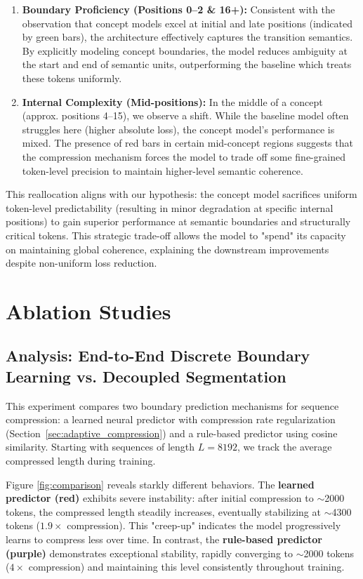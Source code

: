 \begin{enumerate}
    \item \textbf{Boundary Proficiency (Positions 0--2 \& 16+):} Consistent with the observation that concept models excel at initial and late positions (indicated by green bars), the architecture effectively captures the transition semantics. By explicitly modeling concept boundaries, the model reduces ambiguity at the start and end of semantic units, outperforming the baseline which treats these tokens uniformly.
    
    \item \textbf{Internal Complexity (Mid-positions):} In the middle of a concept (approx. positions 4--15), we observe a shift. While the baseline model often struggles here (higher absolute loss), the concept model's performance is mixed. The presence of red bars in certain mid-concept regions suggests that the compression mechanism forces the model to trade off some fine-grained token-level precision to maintain higher-level semantic coherence.
\end{enumerate}

This reallocation aligns with our hypothesis: the concept model sacrifices uniform token-level predictability (resulting in minor degradation at specific internal positions) to gain superior performance at semantic boundaries and structurally critical tokens. This strategic trade-off allows the model to "spend" its capacity on maintaining global coherence, explaining the downstream improvements despite non-uniform loss reduction.

\section{Ablation Studies}

\subsection{Analysis: End-to-End Discrete Boundary Learning vs. Decoupled Segmentation}

This experiment compares two boundary prediction mechanisms for sequence compression: a learned neural predictor with compression rate regularization (Section~\ref{sec:adaptive_compression}) and a rule-based predictor using cosine similarity. Starting with sequences of length $L=8192$, we track the average compressed length during training.

Figure \ref{fig:comparison} reveals starkly different behaviors. The \textbf{learned predictor (red)} exhibits severe instability: after initial compression to $\sim$2000 tokens, the compressed length steadily increases, eventually stabilizing at $\sim$4300 tokens ($1.9\times$ compression). This "creep-up" indicates the model progressively learns to compress less over time. In contrast, the \textbf{rule-based predictor (purple)} demonstrates exceptional stability, rapidly converging to $\sim$2000 tokens ($4\times$ compression) and maintaining this level consistently throughout training.

